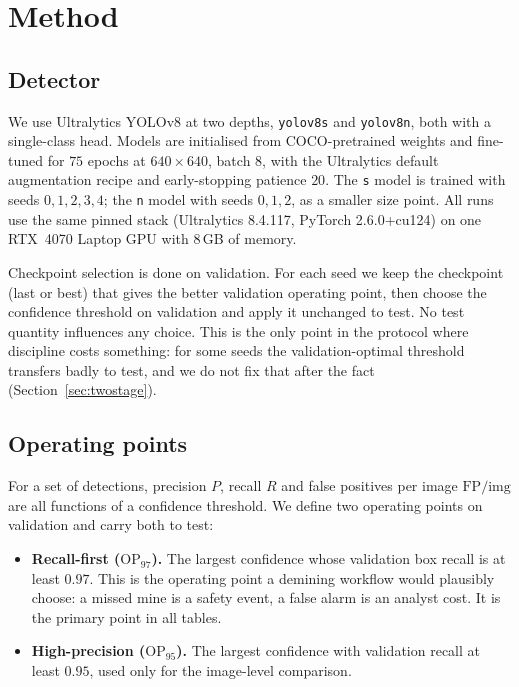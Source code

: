 \section{Method}
\label{sec:method}

\subsection{Detector}

We use Ultralytics YOLOv8 \citep{jocher2023ultralytics} at two depths,
\texttt{yolov8s} and \texttt{yolov8n}, both with a single-class head. Models are
initialised from COCO-pretrained weights and fine-tuned for $75$ epochs at
$640\times640$, batch $8$, with the Ultralytics default augmentation recipe and
early-stopping patience $20$. The \texttt{s} model is trained with seeds
$0,1,2,3,4$; the \texttt{n} model with seeds $0,1,2$, as a smaller size point. All
runs use the same pinned stack (Ultralytics 8.4.117, PyTorch 2.6.0+cu124) on one
RTX~4070 Laptop GPU with $8$\,GB of memory.

Checkpoint selection is done on validation. For each seed we keep the checkpoint
(last or best) that gives the better validation operating point, then choose the
confidence threshold on validation and apply it unchanged to test. No test
quantity influences any choice. This is the only point in the protocol where
discipline costs something: for some seeds the validation-optimal threshold
transfers badly to test, and we do not fix that after the fact
(Section~\ref{sec:twostage}).

\subsection{Operating points}

For a set of detections, precision $P$, recall $R$ and false positives per image
$\mathrm{FP/img}$ are all functions of a confidence threshold. We define two
operating points on validation and carry both to test:

\begin{itemize}[leftmargin=1.2em,itemsep=2pt]
\item \textbf{Recall-first ($\mathrm{OP}_{97}$).} The largest confidence whose
validation box recall is at least $0.97$. This is the operating point a
demining workflow would plausibly choose: a missed mine is a safety event, a
false alarm is an analyst cost. It is the primary point in all tables.
\item \textbf{High-precision ($\mathrm{OP}_{95}$).} The largest confidence with
validation recall at least $0.95$, used only for the image-level comparison.
\end{itemize}

